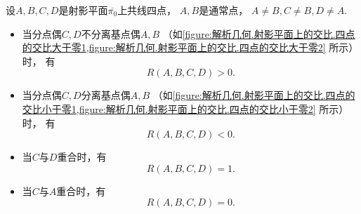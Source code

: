 \begin{property}
设\(A,B,C,D\)是射影平面\(\overline{\pi_0}\)上共线四点，
\(A,B\)是通常点，
\(
	A \neq B,
	C \neq B,
	D \neq A
\).
\begin{itemize}
	\item 当分点偶\(C,D\)不分离基点偶\(A,B\)
	（如\cref{figure:解析几何.射影平面上的交比.四点的交比大于零1,figure:解析几何.射影平面上的交比.四点的交比大于零2} 所示）时，
	有\begin{equation*}
		R(A,B,C,D) > 0.
	\end{equation*}

	\item 当分点偶\(C,D\)分离基点偶\(A,B\)
	（如\cref{figure:解析几何.射影平面上的交比.四点的交比小于零1,figure:解析几何.射影平面上的交比.四点的交比小于零2} 所示）时，
	有\begin{equation*}
		R(A,B,C,D) < 0.
	\end{equation*}

	\item 当\(C\)与\(D\)重合时，有\begin{equation*}
		R(A,B,C,D) = 1.
	\end{equation*}

	\item 当\(C\)与\(A\)重合时，有\begin{equation*}
		R(A,B,C,D) = 0.
	\end{equation*}
\end{itemize}
\end{property}
